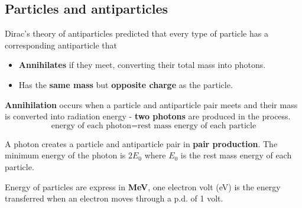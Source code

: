 \subsection{Particles and antiparticles}

Dirac's theory of antiparticles predicted that every type of particle has a corresponding antiparticle that
\begin{itemize}
    \item \textbf{Annihilates} if they meet, converting their total mass into photons.
    \item Has the \textbf{same mass} but \textbf{opposite charge} as the particle.
\end{itemize}

\textbf{Annihilation} occurs when a particle and antiparticle pair meets and their mass is converted into radiation energy - \textbf{two photons} are produced in the process.
$$\text{energy of each photon} = \text{rest mass energy of each particle}$$

A photon creates a particle and antiparticle pair in \textbf{pair production}. The minimum energy of the photon is $2E_0$ where $E_0$ is the rest mass energy of each particle.

Energy of particles are express in \textbf{MeV}, one electron volt (eV) is the energy transferred when an electron moves through a p.d. of 1 volt.
